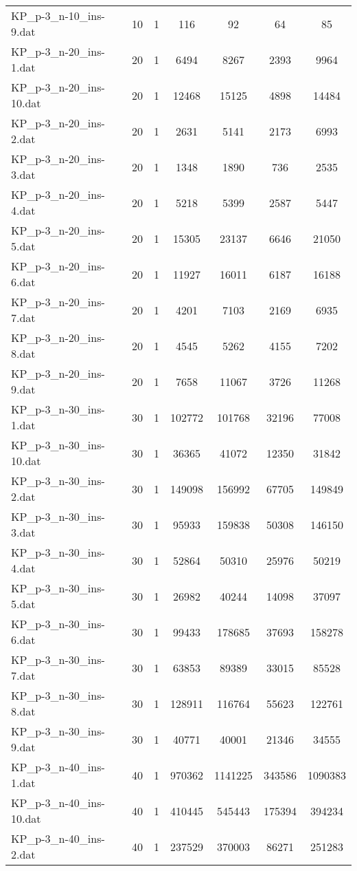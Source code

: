 \begin{table}[!ht]
\begin{tabular}{lcccccc}
KP\_p-3\_n-10\_ins-9.dat & 10 & 1 & 116 & 92 & 64 & 85 \\
KP\_p-3\_n-20\_ins-1.dat & 20 & 1 & 6494 & 8267 & 2393 & 9964 \\
KP\_p-3\_n-20\_ins-10.dat & 20 & 1 & 12468 & 15125 & 4898 & 14484 \\
KP\_p-3\_n-20\_ins-2.dat & 20 & 1 & 2631 & 5141 & 2173 & 6993 \\
KP\_p-3\_n-20\_ins-3.dat & 20 & 1 & 1348 & 1890 & 736 & 2535 \\
KP\_p-3\_n-20\_ins-4.dat & 20 & 1 & 5218 & 5399 & 2587 & 5447 \\
KP\_p-3\_n-20\_ins-5.dat & 20 & 1 & 15305 & 23137 & 6646 & 21050 \\
KP\_p-3\_n-20\_ins-6.dat & 20 & 1 & 11927 & 16011 & 6187 & 16188 \\
KP\_p-3\_n-20\_ins-7.dat & 20 & 1 & 4201 & 7103 & 2169 & 6935 \\
KP\_p-3\_n-20\_ins-8.dat & 20 & 1 & 4545 & 5262 & 4155 & 7202 \\
KP\_p-3\_n-20\_ins-9.dat & 20 & 1 & 7658 & 11067 & 3726 & 11268 \\
KP\_p-3\_n-30\_ins-1.dat & 30 & 1 & 102772 & 101768 & 32196 & 77008 \\
KP\_p-3\_n-30\_ins-10.dat & 30 & 1 & 36365 & 41072 & 12350 & 31842 \\
KP\_p-3\_n-30\_ins-2.dat & 30 & 1 & 149098 & 156992 & 67705 & 149849 \\
KP\_p-3\_n-30\_ins-3.dat & 30 & 1 & 95933 & 159838 & 50308 & 146150 \\
KP\_p-3\_n-30\_ins-4.dat & 30 & 1 & 52864 & 50310 & 25976 & 50219 \\
KP\_p-3\_n-30\_ins-5.dat & 30 & 1 & 26982 & 40244 & 14098 & 37097 \\
KP\_p-3\_n-30\_ins-6.dat & 30 & 1 & 99433 & 178685 & 37693 & 158278 \\
KP\_p-3\_n-30\_ins-7.dat & 30 & 1 & 63853 & 89389 & 33015 & 85528 \\
KP\_p-3\_n-30\_ins-8.dat & 30 & 1 & 128911 & 116764 & 55623 & 122761 \\
KP\_p-3\_n-30\_ins-9.dat & 30 & 1 & 40771 & 40001 & 21346 & 34555 \\
KP\_p-3\_n-40\_ins-1.dat & 40 & 1 & 970362 & 1141225 & 343586 & 1090383 \\
KP\_p-3\_n-40\_ins-10.dat & 40 & 1 & 410445 & 545443 & 175394 & 394234 \\
KP\_p-3\_n-40\_ins-2.dat & 40 & 1 & 237529 & 370003 & 86271 & 251283 \\

\end{tabular}
\end{table}
